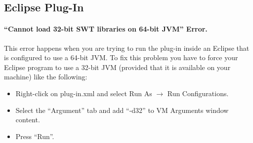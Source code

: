 \subsection{Eclipse Plug-In}
\paragraph{``Cannot load 32-bit SWT libraries on 64-bit JVM'' Error.} This error happens when you are trying to run the plug-in inside an Eclipse that is configured to use a 64-bit JVM. To fix this problem you have to force your Eclipse program to use a 32-bit JVM (provided that it is available on your machine) like the following:
\begin{itemize}
\item Right-click on plug-in.xml and select Run As $\rightarrow$ Run Configurations.
\item Select the ``Argument'' tab and add ``-d32'' to VM Arguments window content.
\item Press ``Run''.
\end{itemize}